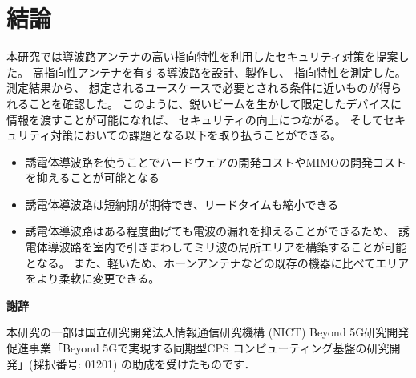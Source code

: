 \documentclass[technicalreport]{ieicej}
\begin{document}
\section{結論}

本研究では導波路アンテナの高い指向特性を利用したセキュリティ対策を提案した。
高指向性アンテナを有する導波路を設計、製作し、
指向特性を測定した。
測定結果から、
想定されるユースケースで必要とされる条件に近いものが得られることを確認した。
このように、鋭いビームを生かして限定したデバイスに情報を渡すことが可能になれば、
セキュリティの向上につながる。
そしてセキュリティ対策においての課題となる以下を取り払うことができる。

\begin{itemize}
  \item 誘電体導波路を使うことでハードウェアの開発コストやMIMOの開発コストを抑えることが可能となる
  \item 誘電体導波路は短納期が期待でき、リードタイムも縮小できる
  \item 誘電体導波路はある程度曲げても電波の漏れを抑えることができるため、
  誘電体導波路を室内で引きまわしてミリ波の局所エリアを構築することが可能となる。
  また、軽いため、ホーンアンテナなどの既存の機器に比べてエリアをより柔軟に変更できる。
\end{itemize}

\begin{center}
  \Large \textbf{謝辞}
\end{center}

本研究の一部は国立研究開発法人情報通信研究機構 (NICT) 
Beyond 5G研究開発促進事業「Beyond 5Gで実現する同期型CPS
コンピューティング基盤の研究開発」(採択番号: 01201) の助成を受けたものです．

%
%

\end{document}
